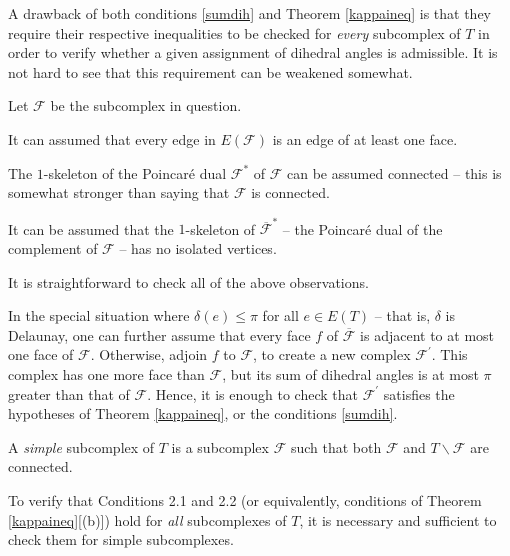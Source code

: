 \documentclass{acmart}
\newcommand{\thm}[2]{\begin{#1} #2 \end{#1}}
\begin{document}
A drawback of both conditions \ref{sumdih} and Theorem \ref{kappaineq}
is that they require their respective inequalities to be checked for
\emph{every} subcomplex of $T$ in order to verify whether a given
assignment of dihedral angles is admissible. It is not hard to see
that this requirement can be weakened somewhat.

Let $\mathcal{F}$ be the subcomplex in question.

\thm{observation}
{
\label{obs1}
It can assumed that every edge in $E(\mathcal{F})$ is an edge
of at least one face.
}

\thm{observation}
{
\label{obs2}
The $1$-skeleton of the Poincar\'e dual $\mathcal{F}^*$ of
$\mathcal{F}$ can be assumed connected -- this is somewhat 
stronger than saying that $\mathcal{F}$ is connected.
}

\thm{observation}
{
\label{obs3}
It can be assumed that the $1$-skeleton of $\overline{\mathcal{F}}^*$
-- the Poincar\'e dual of the complement of $\mathcal{F}$ -- has no
isolated vertices.  
}

It is straightforward to check all of the above observations.

In the special situation where $\delta(e)\leq \pi$ for all $e\in E(T)$ -- that is,
$\delta$ is Delaunay, one can further assume that every face $f$ of 
$\overline{\mathcal{F}}$ is adjacent to at most one face of $\mathcal{F}$. Otherwise,
adjoin $f$ to $\mathcal{F}$, to create a new complex $\mathcal{F}^\prime$. 
This complex has one more face than $\mathcal{F}$, but its sum of dihedral angles
is at most $\pi$ greater than that of $\mathcal{F}$. Hence, it is enough to check
that $\mathcal{F}^\prime$ satisfies the hypotheses of Theorem
\ref{kappaineq}, or the conditions \ref{sumdih}.


\thm{definition}
{
A \emph{simple} subcomplex of $T$ is a subcomplex $\mathcal{F}$ such
that both $\mathcal{F}$ and $T \backslash \mathcal{F}$ are connected.
}

\thm{theorem}
{
\label{versimple}
To verify that Conditions 2.1 and 2.2 (or equivalently, conditions of
Theorem \ref{kappaineq}[(b)]) hold for \emph{all} subcomplexes
of $T$, it is necessary and sufficient to check them for simple
subcomplexes. 
}
\end{document}

